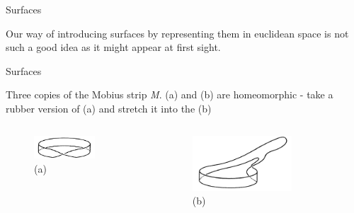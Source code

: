 \documentclass{beamer}
\begin{document}
\begin{frame}{Surfaces}
  \begin{block}{}
    Our way of introducing surfaces by representing them in euclidean space is not such a good idea as it might appear at first sight.
  \end{block}
\end{frame}

\begin{frame}{Surfaces}
  \begin{block}{}
    Three copies of the Mobius strip \textsl{M}. (a) and (b) are homeomorphic - take a rubber version of (a) and stretch it into the (b)
  \end{block}
  \begin{columns}
    \begin{column}{0.5\textwidth}
      \begin{figure}
        \centering
        \includegraphics[width=0.7\textwidth]{figure_1_14_a.png}
        \caption{(a)}
      \end{figure}
    \end{column}
    \begin{column}{0.5\textwidth}
      \begin{figure}
        \centering
        \includegraphics[width=0.7\textwidth]{figure_1_14_b.png}
        \caption{(b)}
      \end{figure}
    \end{column}
  \end{columns}
\end{frame}
\end{document}
